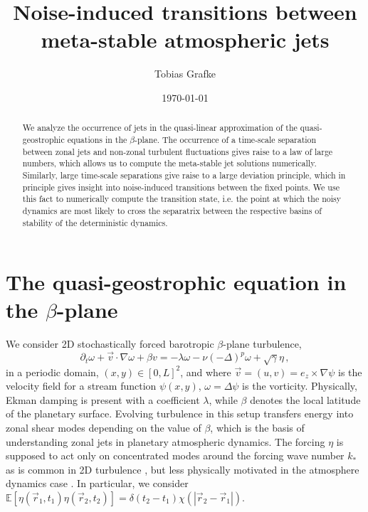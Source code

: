 \documentclass[12pt]{amsart}
\def\EE{\mathbb{E}}\def\PP{\mathbb{P}}
\begin{document}
\title{Noise-induced transitions between meta-stable atmospheric jets}
\date{\today}
\author{Tobias Grafke}

\begin{abstract}
  We analyze the occurrence of jets in the quasi-linear approximation
  of the quasi-geostrophic equations in the $\beta$-plane. The
  occurrence of a time-scale separation between zonal jets and
  non-zonal turbulent fluctuations gives raise to a law of large
  numbers, which allows us to compute the meta-stable jet solutions
  numerically. Similarly, large time-scale separations give raise to a
  large deviation principle, which in principle gives insight into
  noise-induced transitions between the fixed points. We use this fact
  to numerically compute the transition state, i.e. the point at which
  the noisy dynamics are most likely to cross the separatrix between
  the respective basins of stability of the deterministic dynamics.
\end{abstract}

\maketitle

\section{The quasi-geostrophic equation in the $\beta$-plane}

We consider 2D stochastically forced barotropic $\beta$-plane
turbulence,
\begin{equation}
  \label{eq:qg}
  \partial_t \omega + \vec{v}\cdot \nabla \omega + \beta v =
  -\lambda\omega - \nu (-\Delta)^p \omega + \sqrt{\gamma}\eta\,,
\end{equation}
in a periodic domain, $(x,y)\in[0,L]^2$, and where $\vec{v}=(u, v) =
e_z \times \nabla \psi$ is the velocity field for a stream function
$\psi(x,y)$, $\omega = \Delta \psi$ is the vorticity. Physically,
Ekman damping is present with a coefficient $\lambda$, while $\beta$
denotes the local latitude of the planetary surface. Evolving
turbulence in this setup transfers energy into zonal shear modes
\cite{rhines:1975} depending on the value of $\beta$, which is the
basis of understanding zonal jets in planetary atmospheric
dynamics. The forcing $\eta$ is supposed to act only on concentrated
modes around the forcing wave number $k_*$ as is common in 2D
turbulence \cite{lilly:1969}, but less physically motivated in the
atmosphere dynamics case \cite{srinivasan-young:2011}. In particular,
we consider $\EE\left[\eta(\vec r_1, t_1)\eta(\vec
  r_2,t_2)\right]=\delta(t_2-t_1) \chi(|\vec r_2- \vec r_1|)$.
\end{document}
